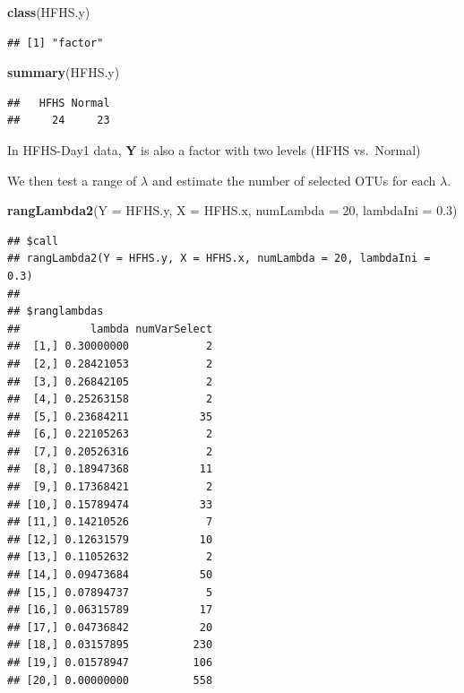 \documentclass[openany]{book}
\newenvironment{Shaded}{\begin{snugshade}}{\end{snugshade}}
\newcommand{\KeywordTok}[1]{\textcolor[rgb]{0.13,0.29,0.53}{\textbf{#1}}}
\newcommand{\DataTypeTok}[1]{\textcolor[rgb]{0.13,0.29,0.53}{#1}}
\newcommand{\DecValTok}[1]{\textcolor[rgb]{0.00,0.00,0.81}{#1}}
\newcommand{\FloatTok}[1]{\textcolor[rgb]{0.00,0.00,0.81}{#1}}
\newcommand{\NormalTok}[1]{#1}
\begin{document}
\begin{Shaded}
\begin{Highlighting}[]
\KeywordTok{class}\NormalTok{(HFHS.y)}
\end{Highlighting}
\end{Shaded}

\begin{verbatim}
## [1] "factor"
\end{verbatim}

\begin{Shaded}
\begin{Highlighting}[]
\KeywordTok{summary}\NormalTok{(HFHS.y)}
\end{Highlighting}
\end{Shaded}

\begin{verbatim}
##   HFHS Normal 
##     24     23
\end{verbatim}

In HFHS-Day1 data, \textbf{Y} is also a factor with two levels (HFHS
vs.~Normal)

We then test a range of \(\lambda\) and estimate the number of selected
OTUs for each \(\lambda\).

\begin{Shaded}
\begin{Highlighting}[]
\KeywordTok{rangLambda2}\NormalTok{(}\DataTypeTok{Y =}\NormalTok{ HFHS.y, }\DataTypeTok{X =}\NormalTok{ HFHS.x, }\DataTypeTok{numLambda =} \DecValTok{20}\NormalTok{, }\DataTypeTok{lambdaIni =} \FloatTok{0.3}\NormalTok{)}
\end{Highlighting}
\end{Shaded}

\begin{verbatim}
## $call
## rangLambda2(Y = HFHS.y, X = HFHS.x, numLambda = 20, lambdaIni = 0.3)
## 
## $ranglambdas
##           lambda numVarSelect
##  [1,] 0.30000000            2
##  [2,] 0.28421053            2
##  [3,] 0.26842105            2
##  [4,] 0.25263158            2
##  [5,] 0.23684211           35
##  [6,] 0.22105263            2
##  [7,] 0.20526316            2
##  [8,] 0.18947368           11
##  [9,] 0.17368421            2
## [10,] 0.15789474           33
## [11,] 0.14210526            7
## [12,] 0.12631579           10
## [13,] 0.11052632            2
## [14,] 0.09473684           50
## [15,] 0.07894737            5
## [16,] 0.06315789           17
## [17,] 0.04736842           20
## [18,] 0.03157895          230
## [19,] 0.01578947          106
## [20,] 0.00000000          558
\end{verbatim}
\end{document}
